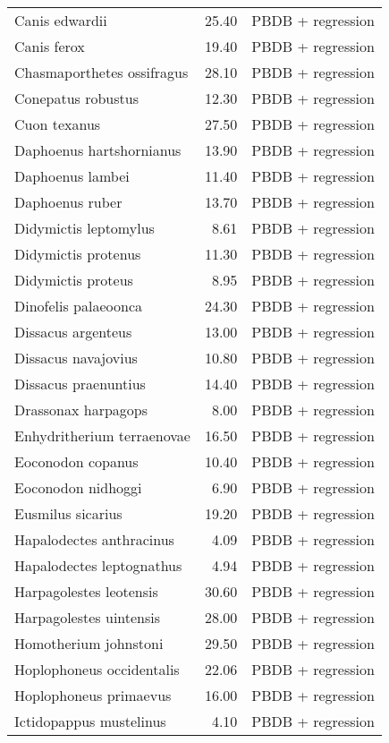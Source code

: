 \begin{table}[ht]
\begin{tabular}{lrl}
  Canis edwardii & 25.40 & PBDB + regression \\ 
  Canis ferox & 19.40 & PBDB + regression \\ 
  Chasmaporthetes ossifragus & 28.10 & PBDB + regression \\ 
  Conepatus robustus & 12.30 & PBDB + regression \\ 
  Cuon texanus & 27.50 & PBDB + regression \\ 
  Daphoenus hartshornianus & 13.90 & PBDB + regression \\ 
  Daphoenus lambei & 11.40 & PBDB + regression \\ 
  Daphoenus ruber & 13.70 & PBDB + regression \\ 
  Didymictis leptomylus & 8.61 & PBDB + regression \\ 
  Didymictis protenus & 11.30 & PBDB + regression \\ 
  Didymictis proteus & 8.95 & PBDB + regression \\ 
  Dinofelis palaeoonca & 24.30 & PBDB + regression \\ 
  Dissacus argenteus & 13.00 & PBDB + regression \\ 
  Dissacus navajovius & 10.80 & PBDB + regression \\ 
  Dissacus praenuntius & 14.40 & PBDB + regression \\ 
  Drassonax harpagops & 8.00 & PBDB + regression \\ 
  Enhydritherium terraenovae & 16.50 & PBDB + regression \\ 
  Eoconodon copanus & 10.40 & PBDB + regression \\ 
  Eoconodon nidhoggi & 6.90 & PBDB + regression \\ 
  Eusmilus sicarius & 19.20 & PBDB + regression \\ 
  Hapalodectes anthracinus & 4.09 & PBDB + regression \\ 
  Hapalodectes leptognathus & 4.94 & PBDB + regression \\ 
  Harpagolestes leotensis & 30.60 & PBDB + regression \\ 
  Harpagolestes uintensis & 28.00 & PBDB + regression \\ 
  Homotherium johnstoni & 29.50 & PBDB + regression \\ 
  Hoplophoneus occidentalis & 22.06 & PBDB + regression \\ 
  Hoplophoneus primaevus & 16.00 & PBDB + regression \\ 
  Ictidopappus mustelinus & 4.10 & PBDB + regression \\ 

\end{tabular}
\end{table}
